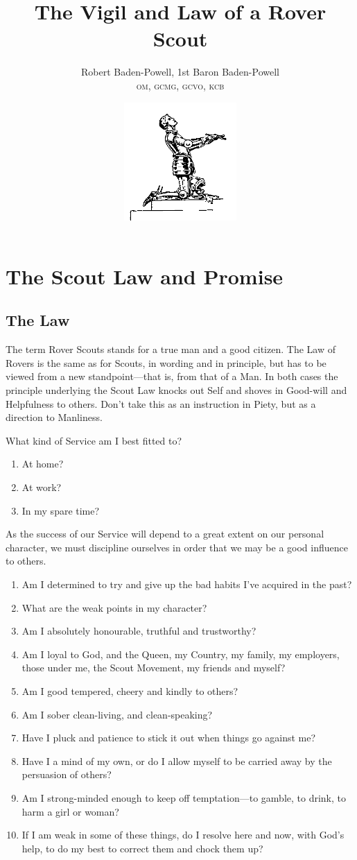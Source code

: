 \documentclass[11pt]{article}
\title{The Vigil and Law of a Rover Scout}%
\author{Robert Baden-Powell, 1st Baron Baden-Powell \\ \small{\textsc{om, gcmg, gcvo, kcb}}}
\date{ \includegraphics[width=0.32\textwidth]{knight} } %
\begin{document}
\maketitle

\pagebreak

\tableofcontents


\break
\section{The Scout Law and Promise}

\subsection{The Law}
The term Rover Scouts stands for a true man and a good citizen. The Law of Rovers is the same as for Scouts, in wording and in principle, but has to be viewed from a new standpoint---that is, from that of a Man. In both cases the principle underlying the Scout Law knocks out Self and shoves in Good-will and Helpfulness to others. Don't take this as an instruction in Piety, but as a direction to Manliness.

What kind of Service am I best fitted to?
\begin{enumerate}
  \item At home?
  \item At work?
  \item In my spare time?
\end{enumerate}

As the success of our Service will depend to a great extent on our personal character, we must discipline ourselves in order that we may be a good influence to others.
\begin{enumerate}
  \item Am I determined to try and give up the bad habits I've acquired in the past?
  \item What are the weak points in my character?
  \item Am I absolutely honourable, truthful and trustworthy?
  \item Am I loyal to God, and the Queen, my Country, my family, my employers, those under me, the Scout Movement, my friends and myself?
  \item Am I good tempered, cheery and kindly to others?
  \item Am I sober clean-living, and clean-speaking?
  \item Have I pluck and patience to stick it out when things go against me?
  \item Have I a mind of my own, or do I allow myself to be carried away by the persuasion of others?
  \item Am I strong-minded enough to keep off temptation---to gamble, to drink, to harm a girl or woman?
  \item If I am weak in some of these things, do I resolve here and now, with God's help, to do my best to correct them and chock them up?
\end{enumerate}
\end{document}
